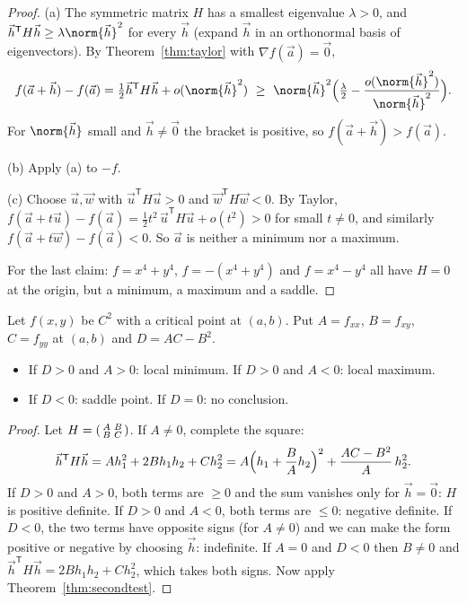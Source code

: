 \begin{proof}
(a) The symmetric matrix $H$ has a smallest eigenvalue $\lambda>0$, and $\vec h^{\mathsf T}H\vec h\ge\lambda\norm{\vec h}^2$ for every $\vec h$ (expand $\vec h$ in an orthonormal basis of eigenvectors). By Theorem~\ref{thm:taylor} with $\nabla f(\vec a)=\vec0$,
\[
f(\vec a+\vec h)-f(\vec a)=\tfrac12\vec h^{\mathsf T}H\vec h+o(\norm{\vec h}^2)\ \ge\ \norm{\vec h}^2\Bigl(\tfrac\lambda2-\frac{o(\norm{\vec h}^2)}{\norm{\vec h}^2}\Bigr).
\]
For $\norm{\vec h}$ small and $\vec h\ne\vec 0$ the bracket is positive, so $f(\vec a+\vec h)>f(\vec a)$.

(b) Apply (a) to $-f$.

(c) Choose $\vec u,\vec w$ with $\vec u^{\mathsf T}H\vec u>0$ and $\vec w^{\mathsf T}H\vec w<0$. By Taylor, $f(\vec a+t\vec u)-f(\vec a)=\tfrac12t^2\,\vec u^{\mathsf T}H\vec u+o(t^2)>0$ for small $t\ne0$, and similarly $f(\vec a+t\vec w)-f(\vec a)<0$. So $\vec a$ is neither a minimum nor a maximum.

For the last claim: $f=x^4+y^4$, $f=-(x^4+y^4)$ and $f=x^4-y^4$ all have $H=0$ at the origin, but a minimum, a maximum and a saddle.
\end{proof}

\begin{corollary}\label{cor:test2d}
Let $f(x,y)$ be $C^2$ with a critical point at $(a,b)$. Put $A=f_{xx}$, $B=f_{xy}$, $C=f_{yy}$ at $(a,b)$ and $D=AC-B^2$.
\begin{itemize}
  \item If $D>0$ and $A>0$: local minimum. If $D>0$ and $A<0$: local maximum.
  \item If $D<0$: saddle point. If $D=0$: no conclusion.
\end{itemize}
\end{corollary}

\begin{proof}
Let $H=\begin{psmallmatrix}A&B\\B&C\end{psmallmatrix}$. If $A\ne0$, complete the square:
\[
\vec h^{\mathsf T}H\vec h=Ah_1^2+2Bh_1h_2+Ch_2^2=A\Bigl(h_1+\frac BAh_2\Bigr)^2+\frac{AC-B^2}{A}\,h_2^2 .
\]
If $D>0$ and $A>0$, both terms are $\ge0$ and the sum vanishes only for $\vec h=\vec 0$: $H$ is positive definite. If $D>0$ and $A<0$, both terms are $\le0$: negative definite. If $D<0$, the two terms have opposite signs (for $A\ne0$) and we can make the form positive or negative by choosing $\vec h$: indefinite. If $A=0$ and $D<0$ then $B\neq0$ and $\vec h^{\mathsf T}H\vec h=2Bh_1h_2+Ch_2^2$, which takes both signs. Now apply Theorem~\ref{thm:secondtest}.
\end{proof}

